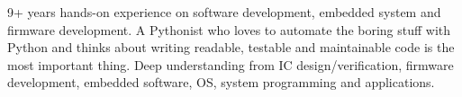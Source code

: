 

\begin{cvparagraph}

9+ years hands-on experience on software development, embedded system and firmware development. A Pythonist who loves to automate the boring stuff with Python and thinks about writing readable, testable and maintainable code is the most important thing. Deep understanding from IC design/verification, firmware development, embedded software, OS, system programming and applications. 
\end{cvparagraph}
